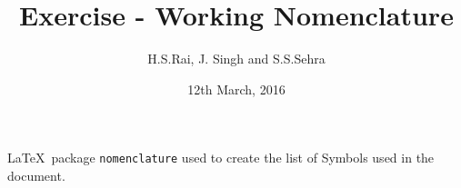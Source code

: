 \documentclass[11pt,a4paper]{article}
\title{Exercise - Working Nomenclature}
\date{12th March, 2016}
\author{H.S.Rai, J. Singh and S.S.Sehra}
\begin{document}
\maketitle
\tableofcontents

\LaTeX\ package \verb|nomenclature| used to create the list of Symbols used in the document. 
 

\printnomenclature
\end{document}

